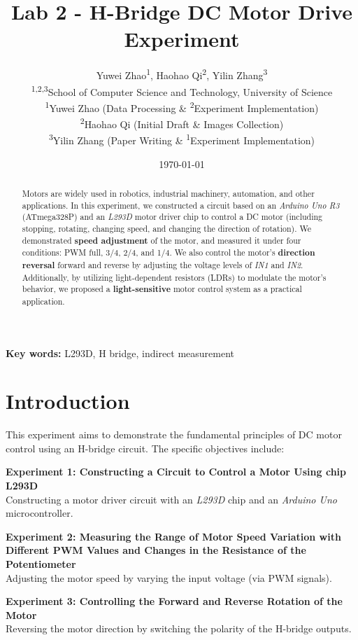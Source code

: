 \documentclass[a4paper,12pt]{article}
\title{\textbf{Lab 2 - H-Bridge DC Motor Drive Experiment}}
\author{
  Yuwei Zhao\textsuperscript{1},
  Haohao Qi\textsuperscript{2},
  Yilin Zhang\textsuperscript{3} \\
  \small\textsuperscript{1,2,3}School of Computer Science and Technology, University of Science \\
  \small\textsuperscript{1}Yuwei Zhao (Data Processing \&  \small\textsuperscript{2}Experiment Implementation) \\
  \small\textsuperscript{2}Haohao Qi (Initial Draft  \& Images Collection) \\
  \small\textsuperscript{3}Yilin Zhang (Paper Writing  \& \small\textsuperscript{1}Experiment Implementation)
}
\date{\today}
\begin{document}
\maketitle
\thispagestyle{fancy}
\vspace*{-0.5em}

\begin{abstract} 
\noindent Motors are widely used in robotics, industrial machinery, automation, and other applications. 
In this experiment, we constructed a circuit based on an \textit{Arduino Uno R3} (ATmega328P) and an \textit{L293D} motor driver chip to control a DC motor 
(including stopping, rotating, changing speed, and changing the direction of rotation). 
We demonstrated \textbf{speed adjustment} of the motor, and 
measured it under four conditions: 
PWM full, 3/4, 2/4, and 1/4.
We also control the motor's \textbf{direction reversal} forward and reverse by adjusting the voltage levels of \textit{IN1} and \textit{IN2}.
Additionally, by utilizing light-dependent resistors (LDRs) to modulate the motor's behavior, 
we proposed a \textbf{light-sensitive} motor control system as a practical application.
\end{abstract}

\textbf{Key words:} 
L293D, H bridge, indirect measurement

\section*{Introduction}
This experiment aims to demonstrate the fundamental principles of DC motor control using an H-bridge circuit. 
The specific objectives include:

\textbf{Experiment 1: Constructing a Circuit to Control a Motor Using chip L293D} \\ 
Constructing a motor driver circuit with an \textit{L293D} chip and an \textit{Arduino Uno} microcontroller.

\textbf{Experiment 2: Measuring the Range of Motor Speed Variation with Different PWM Values and Changes in the Resistance of the Potentiometer} \\ 
Adjusting the motor speed by varying the input voltage (via PWM signals). 

\textbf{Experiment 3: Controlling the Forward and Reverse Rotation of the Motor} \\ 
Reversing the motor direction by switching the polarity of the H-bridge outputs.  
\end{document}
